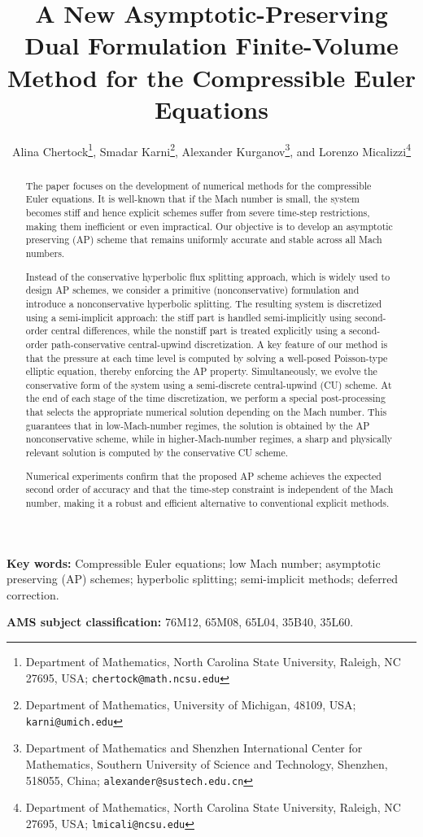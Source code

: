 \documentclass[A4paper,12pt,twoside]{article}
\title{A New Asymptotic-Preserving Dual Formulation Finite-Volume Method for the Compressible Euler Equations}
\author{Alina Chertock\thanks{Department of Mathematics, North Carolina State University, Raleigh, NC 27695, USA;
{\tt chertock@math.ncsu.edu}}, Smadar Karni\thanks{Department of Mathematics, University of Michigan, 48109, USA; {\tt karni@umich.edu}},
Alexander Kurganov\thanks{Department of Mathematics and Shenzhen International Center for Mathematics, Southern University of Science and
Technology, Shenzhen, 518055, China; {\tt alexander@sustech.edu.cn}}, and Lorenzo Micalizzi\thanks{Department of Mathematics, North Carolina
State University, Raleigh, NC 27695, USA; {\tt lmicali@ncsu.edu}}}
\date{}
\numberwithin{equation}{section}
\numberwithin{figure}{section}
\numberwithin{table}{section}
\begin{document}
\maketitle

\begin{abstract}
The paper focuses on the development of numerical methods for the compressible Euler equations. It is well-known that if the Mach number is
small, the system becomes stiff and hence explicit schemes suffer from severe time-step restrictions, making them inefficient or even
impractical. Our objective is to develop an asymptotic preserving (AP) scheme that remains uniformly accurate and stable across all Mach
numbers.

Instead of the conservative hyperbolic flux splitting approach, which is widely used to design AP schemes, we consider a primitive
(nonconservative) formulation and introduce a nonconservative hyperbolic splitting. The resulting system is discretized using a
semi-implicit approach: the stiff part is handled semi-implicitly using second-order central differences, while the nonstiff part is treated
explicitly using a second-order path-conservative central-upwind discretization. A key feature of our method is that the pressure at each
time level is computed by solving a well-posed Poisson-type elliptic equation, thereby enforcing the AP property. Simultaneously, we evolve
the conservative form of the system using a semi-discrete central-upwind (CU) scheme. At the end of each stage of the time discretization,
we perform a special post-processing that selects the appropriate numerical solution depending on the Mach number. This guarantees that in
low-Mach-number regimes, the solution is obtained by the AP nonconservative scheme, while in higher-Mach-number regimes, a sharp and
physically relevant solution is computed by the conservative CU scheme.

Numerical experiments confirm that the proposed AP scheme achieves the expected second order of accuracy and that the time-step constraint
is independent of the Mach number, making it a robust and efficient alternative to conventional explicit methods.
\end{abstract}

\noindent
{\bf Key words:} Compressible Euler equations; low Mach number; asymptotic preserving (AP) schemes; hyperbolic splitting; semi-implicit
methods; deferred correction.

\medskip
\noindent
{\bf AMS subject classification:} 76M12, 65M08, 65L04, 35B40, 35L60.
\end{document}
